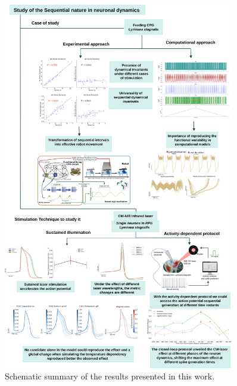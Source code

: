 \begin{figure}[htb!]
	\centering
	\includegraphics[width=0.9\textwidth]{img/panel discussion.png}
	\caption{Schematic summary of the results presented in this work.}
	\label{fig:summary conlusions}
\end{figure}

